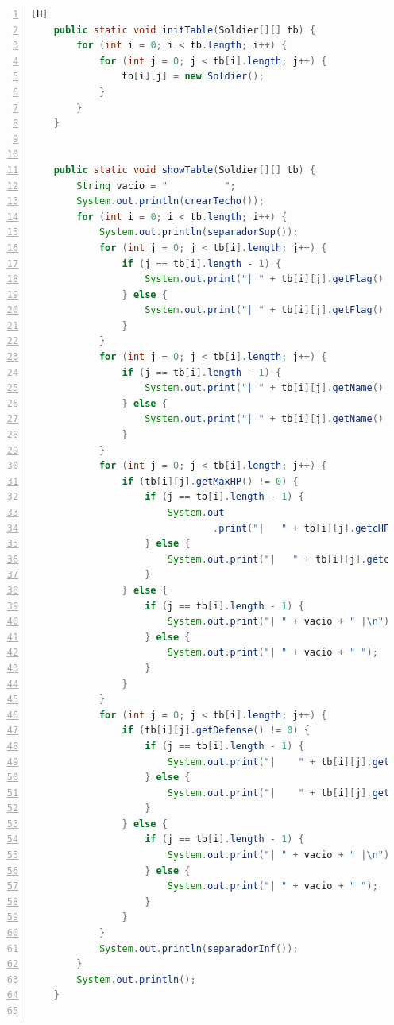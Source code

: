 \documentclass{article}
\begin{document}
	\begin{lstlisting}[language=java,caption={Show Table and Init Table}, numbers=left][H]
	public static void initTable(Soldier[][] tb) {
        for (int i = 0; i < tb.length; i++) {
            for (int j = 0; j < tb[i].length; j++) {
                tb[i][j] = new Soldier();
            }
        }
    }	
	
	
	public static void showTable(Soldier[][] tb) {
        String vacio = "          ";
        System.out.println(crearTecho());
        for (int i = 0; i < tb.length; i++) {
            System.out.println(separadorSup());
            for (int j = 0; j < tb[i].length; j++) {
                if (j == tb[i].length - 1) {
                    System.out.print("| " + tb[i][j].getFlag() + " |\n");
                } else {
                    System.out.print("| " + tb[i][j].getFlag() + " ");
                }
            }
            for (int j = 0; j < tb[i].length; j++) {
                if (j == tb[i].length - 1) {
                    System.out.print("| " + tb[i][j].getName() + " |\n");
                } else {
                    System.out.print("| " + tb[i][j].getName() + " ");
                }
            }
            for (int j = 0; j < tb[i].length; j++) {
                if (tb[i][j].getMaxHP() != 0) {
                    if (j == tb[i].length - 1) {
                        System.out
                                .print("|   " + tb[i][j].getcHP() + "/" + tb[i][j].getMaxHP() + " HP" + "   |\n");
                    } else {
                        System.out.print("|   " + tb[i][j].getcHP() + "/" + tb[i][j].getMaxHP() + " HP" + "   ");
                    }
                } else {
                    if (j == tb[i].length - 1) {
                        System.out.print("| " + vacio + " |\n");
                    } else {
                        System.out.print("| " + vacio + " ");
                    }
                }
            }
            for (int j = 0; j < tb[i].length; j++) {
                if (tb[i][j].getDefense() != 0) {
                    if (j == tb[i].length - 1) {
                        System.out.print("|    " + tb[i][j].getDefense() + " DP" + "    |\n");
                    } else {
                        System.out.print("|    " + tb[i][j].getDefense() + " DP" + "    ");
                    }
                } else {
                    if (j == tb[i].length - 1) {
                        System.out.print("| " + vacio + " |\n");
                    } else {
                        System.out.print("| " + vacio + " ");
                    }
                }
            }
            System.out.println(separadorInf());
        }
        System.out.println();
    }


\end{lstlisting}
\end{document}
